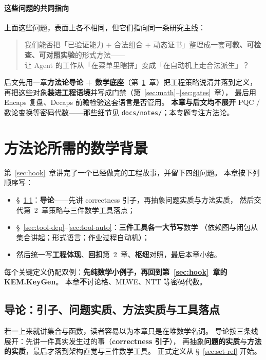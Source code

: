 \documentclass[UTF8,a4paper,11pt]{ctexart}
\theoremstyle{definition}
\theoremstyle{plain}
\theoremstyle{remark}
\numberwithin{figure}{section}
\numberwithin{table}{section}
\begin{document}
\paragraph{这些问题的共同指向}

上面这些问题，表面上各不相同，但它们指向同一条研究主线：

\begin{quote}
我们能否把「已验证能力 + 合法组合 + 动态证书」整理成一套\textbf{可教、可检查、可对照实验}的形式方法——\\
让 Agent 的工作从「在菜单里瞎拼」变成「在自动机上走合法派生」？
\end{quote}

后文先用一章\textbf{方法论导论 + 数学底座}（第~\ref{sec:mathbg}~章）把工程策略说清并落到定义，
再把这些对象\textbf{装进工程语境}并写成门禁（第~\ref{sec:math}--\ref{sec:gates}~章），
最后用 Encaps 复盘、Decaps 前瞻检验这套语言是否管用。
\textbf{本章与后文均不展开} PQC / 数论变换等密码代数——那些细节见 \texttt{docs/notes/}；本专题专注方法论。

\section{方法论所需的数学背景}
\label{sec:mathbg}

第~\ref{sec:hook}~章讲完了一个已经做完的工程故事，并留下四组问题。
本章按下列顺序写：
\begin{itemize}
  \item §~\ref{sec:mathbg-intro}：\textbf{导论}——先讲 correctness 引子，再抽象问题实质与方法实质，
        然后交代第~2~章策略与三件数学工具落点；
  \item §~\ref{sec:tool-dep}--\ref{sec:tool-auto}：\textbf{三件工具各一大节}写数学
        （依赖图与闭包从集合讲起；形式语言；作业过程自动机）；
  \item 然后统一写\textbf{工程体现}、\textbf{回扣}第~2~章、\textbf{枢纽}对照，最后本章小结。
\end{itemize}
每个关键定义仍配双例：\textbf{先纯数学小例子，再回到第~\ref{sec:hook}~章的 KEM.KeyGen}。
本章\textbf{不}讨论格、MLWE、NTT 等密码代数。

\subsection{导论：引子、问题实质、方法实质与工具落点}
\label{sec:mathbg-intro}
\label{sec:mathbg-why}

若一上来就讲集合与函数，读者容易以为本章只是在堆数学名词。
导论按三条线展开：先讲一件真实发生过的事（\textbf{correctness 引子}），
再抽象\textbf{问题的实质}与\textbf{方法的实质}，最后才落到架构直觉与三件数学工具。
正式定义从 §~\ref{sec:set-rel} 开始。
\end{document}
